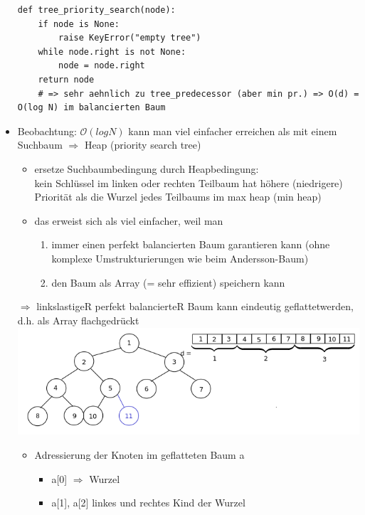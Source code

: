 \documentclass[11pt, fleqn]{scrreprt}
\newcommand{\bigO}[0]{\mathcal{O}}
\begin{document}
\begin{itemize}
        \begin{verbatim}
def tree_priority_search(node):
    if node is None:
        raise KeyError("empty tree")
    while node.right is not None:
        node = node.right
    return node
    # => sehr aehnlich zu tree_predecessor (aber min pr.) => O(d) = O(log N) im balancierten Baum
        \end{verbatim}
        \item Beobachtung: $\bigO{}(logN)$ kann man viel einfacher erreichen als mit einem Suchbaum $\Rightarrow$ Heap (\glqq priority search tree\grqq  )
        \begin{itemize}
            \item ersetze Suchbaumbedingung durch Heapbedingung: \\
            \glqq kein Schlüssel im linken oder rechten Teilbaum hat höhere (niedrigere) Priorität als die Wurzel jedes Teilbaums im max heap (min heap)\grqq
            \item das erweist sich als viel einfacher, weil man
            \begin{enumerate}
                \item immer einen perfekt balancierten Baum garantieren kann (ohne komplexe Umstrukturierungen wie beim Andersson-Baum)
                \item den Baum als Array (= sehr effizient) speichern kann
            \end{enumerate}
        \end{itemize}
        $\Rightarrow$ linkslastigeR perfekt balancierteR Baum kann eindeutig \glqq geflattet\grqq werden, d.h. als Array \glqq flachgedrückt\grqq
        \includegraphics[width=16cm,height=4cm,keepaspectratio]{./Pictures/Flatten.png}
        \begin{itemize}
            \item Adressierung der Knoten im geflatteten Baum a \\
            \begin{itemize}
                \item a[0] $\Rightarrow$ Wurzel
                \item a[1], a[2] linkes und rechtes Kind der Wurzel

\end{itemize}
\end{itemize}
\end{itemize}
\end{document}
